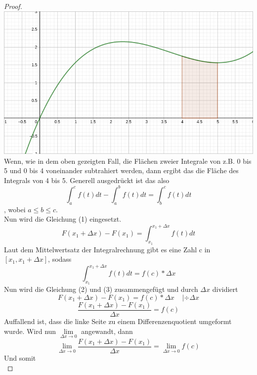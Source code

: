 \documentclass[fontsize=12pt,paper=a4,DIV12,cleardoublepage=empty, 
liststotoc,idxtotoc,bibtotoc]{article}
\theoremstyle{plain}
\theoremstyle{definition}
\begin{document}
\begin{proof}
		\includegraphics[scale=0.2]{Integral 4-5.png} \\
Wenn, wie in dem oben gezeigten Fall, die Flächen zweier Integrale von z.B. 0 bis 5 und 0 bis 4 voneinander subtrahiert werden, dann ergibt das die Fläche des Integrals von 4 bis 5. Generell ausgedrückt ist das also
		\begin{equation*}
			\int_{a}^{c}f(t)dt - \int_{a}^{b}f(t)dt = \int_{b}^{c}f(t)dt
		\end{equation*}
		, wobei $a\leq b\leq c$.\\
		Nun wird die Gleichung (1) eingesetzt.
		\begin{equation}
			F(x_1+\Delta x)-F(x_1)=\int_{x_1}^{x_1+\Delta x}f(t)dt
		\end{equation}
		Laut dem Mittelwertsatz der Integralrechnung gibt es eine Zahl c in $[x_1, x_1+\Delta x]$, sodass
		\begin{equation}
			\int_{x_1}^{x_1+\Delta x}f(t)dt=f(c)*\Delta x
		\end{equation}
		Nun wird die Gleichung (2) und (3) zusammengefügt und durch $\Delta x$ dividiert
		\begin{equation*}
			F(x_1+\Delta x)-F(x_1)=f(c)*\Delta x \;\;\;\;|\div \Delta x
		\end{equation*}
		\begin{equation*}
			\frac{F(x_1+\Delta x)-F(x_1)}{\Delta x}=f(c)
		\end{equation*}
		Auffallend ist, dass die linke Seite zu einem Differenzenquotient umgeformt wurde. Wird nun $\lim \limits_{\Delta x \to 0}$ angewandt, dann
		\begin{equation*}
			\lim \limits_{\Delta x \to 0} \frac{F(x_1+\Delta x)-F(x_1)}{\Delta x}=\lim \limits_{\Delta x \to 0}f(c)
		\end{equation*}
		Und somit
		\begin{equation}

\end{equation}
\end{proof}
\end{document}
